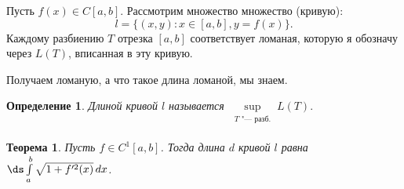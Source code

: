 \documentclass[a4paper,10pt,twoside]{article}
\newtheorem{Def}{Определение}[section]
\newtheorem{The}{Теорема}[section]
\begin{document}
    Пусть $f(x)\in C[a,b]$. Рассмотрим множество множество (кривую):
    $$l=\big\{(x,y)\colon x\in[a,b], y=f(x)\big\}.$$
    Каждому разбиению $T$ отрезка $[a,b]$ соответствует ломаная, которую я обозначу через $L(T)$, вписанная в эту кривую.
    
    Получаем ломаную, а что такое длина ломаной, мы знаем.
    
    \begin{Def}
    	Длиной кривой $l$ называется $\sup\limits_{\substack{T\text{ "--- разб.}\\ [a,b]}}L(T).$
    \end{Def}
    
    \begin{The}\label{DDK}
    	Пусть $f\in C^1[a,b]$. Тогда длина $d$ кривой $l$ равна $\ds\int\limits_a^b\sqrt{1+f'^2(x)}\,dx$.
    \end{The}
    
\end{document}
